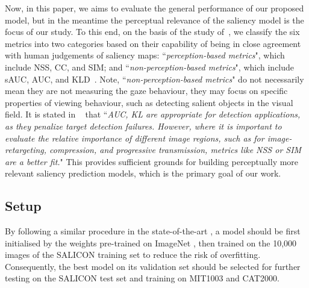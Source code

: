 \documentclass{article}
\begin{document}
Now, in this paper, we aims to evaluate the general performance of our proposed model, but in the meantime the perceptual relevance of the saliency model is the focus of our study. To this end, on the basis of the study of~\cite{Bylinskii_2019}, we classify the six metrics into two categories based on their capability of being in close agreement with human judgements of saliency maps: ``\textit{perception-based metrics}", which include NSS, CC, and SIM; and ``\textit{non-perception-based metrics}", which include sAUC, AUC, and KLD~\cite{Bylinskii_2019}. Note, ``\textit{non-perception-based metrics}" do not necessarily mean they are not measuring the gaze behaviour, they may focus on specific properties of viewing behaviour, such as detecting salient objects in the visual field. It is stated in ~\cite{Bylinskii_2019} that ``\textit{AUC, KL are appropriate for detection applications, as they penalize target detection failures. However, where it is important to evaluate the relative importance of different image regions, such as for image-retargeting, compression, and progressive transmission, metrics like NSS or SIM are a better fit.}" This provides sufficient grounds for building perceptually more relevant saliency prediction models, which is the primary goal of our work.


\subsection{Setup}

\label{pra:setup}
By following a similar procedure in the state-of-the-art \cite{DeepGaze2, Huang_2015, DVA_Wang, MSI-Net, SAM_Cornia}, a model should be first initialised by the weights pre-trained on ImageNet \cite{imagenet}, then trained on the 10,000 images of the SALICON training set to reduce the risk of overfitting. Consequently, the best model on its validation set should be selected for further testing on the SALICON test set and training on MIT1003 and CAT2000. 
\end{document}
